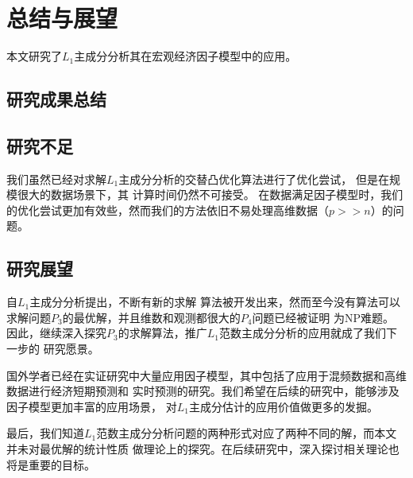 \section{总结与展望}
本文研究了$L_1$主成分分析其在宏观经济因子模型中的应用。

\subsection{研究成果总结}

\subsection{研究不足}
我们虽然已经对求解$L_1$主成分分析的交替凸优化算法进行了优化尝试，
但是在规模很大的数据场景下，其
计算时间仍然不可接受。
在数据满足因子模型时，我们的优化尝试更加有效些，然而我们的方法依旧不易处理高维数据（$p >> n$）的问题。

\subsection{研究展望}
自$L_1$主成分分析提出，不断有新的求解
算法被开发出来，然而至今没有算法可以求解问题$P_3$的最优解，并且维数和观测都很大的$P_4$问题已经被证明
为NP难题。
因此，继续深入探究$P_3$的求解算法，推广$L_1$范数主成分分析的应用就成了我们下一步的
研究愿景。

国外学者已经在实证研究中大量应用因子模型，其中包括了应用于混频数据和高维数据进行经济短期预测和
实时预测的研究。我们希望在后续的研究中，能够涉及因子模型更加丰富的应用场景，
对$L_1$主成分估计的应用价值做更多的发掘。

最后，我们知道$L_1$范数主成分分析问题的两种形式对应了两种不同的解，而本文并未对最优解的统计性质
做理论上的探究。在后续研究中，深入探讨相关理论也将是重要的目标。

